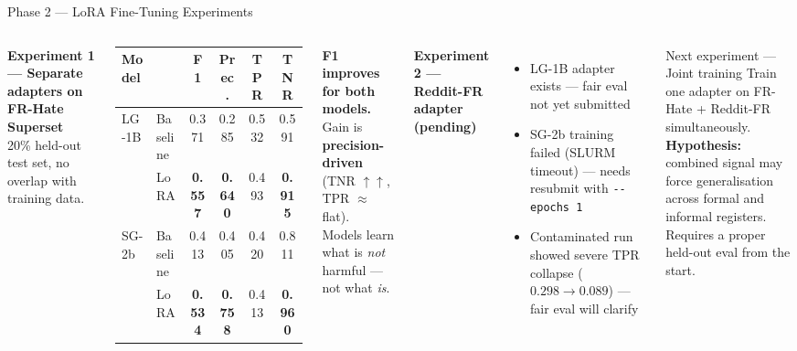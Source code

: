 \documentclass[aspectratio=169, 12pt]{beamer}
\newcommand{\good}[1]{\textcolor{okgreen}{\textbf{#1}}}
\newcommand{\warn}[1]{\textcolor{warnorange}{\textbf{#1}}}
\begin{document}
\begin{frame}[shrink=25]{Phase 2 — LoRA Fine-Tuning Experiments}
  \begin{columns}[T]
      \textbf{Experiment 1 — Separate adapters on FR-Hate Superset}\\
      \small 20\% held-out test set, no overlap with training data.\\[4pt]
      \scriptsize
      \begin{tabular}{llcccc}
        \toprule
        \textbf{Model} & & \textbf{F1} & \textbf{Prec.} & \textbf{TPR} & \textbf{TNR} \\
        \midrule
        \multirow{2}{*}{LG-1B}
          & Baseline & 0.371 & 0.285 & 0.532 & 0.591 \\
          & LoRA     & \good{0.557} & \good{0.640} & 0.493 & \good{0.915} \\
        \midrule
        \multirow{2}{*}{SG-2b}
          & Baseline & 0.413 & 0.405 & 0.420 & 0.811 \\
          & LoRA     & \good{0.534} & \good{0.758} & 0.413 & \good{0.960} \\
        \bottomrule
      \end{tabular}
      \vspace{4pt}
      \small \good{F1 improves for both models.}\\
      Gain is \textbf{precision-driven} (TNR $\uparrow\uparrow$, TPR $\approx$ flat).\\
      Models learn what is \emph{not} harmful — not what \emph{is}.

      \textbf{Experiment 2 — Reddit-FR adapter \warn{(pending)}}\\
      \small
      \begin{itemize}
        \item LG-1B adapter exists — fair eval not yet submitted
        \item SG-2b training failed (SLURM timeout) — needs resubmit with \texttt{-{}-epochs 1}
        \item Contaminated run showed severe TPR collapse ($0.298 \to 0.089$) — fair eval will clarify
      \end{itemize}
      \vspace{5pt}
      \begin{block}{Next experiment — Joint training}
        \small Train one adapter on FR-Hate + Reddit-FR simultaneously.\\[3pt]
        \textbf{Hypothesis:} combined signal may force generalisation across formal and informal registers.\\[3pt]
        Requires a proper held-out eval from the start.
      \end{block}
  \end{columns}
\end{frame}
\end{document}
